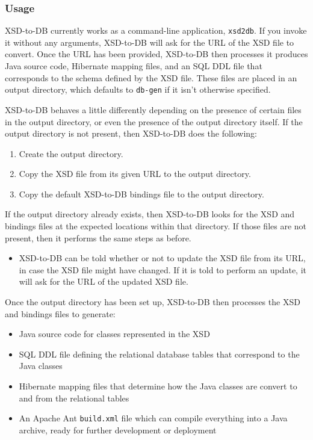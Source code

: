 \documentclass[11pt]{article}
\begin{document}
\subsubsection{Usage}

XSD-to-DB currently works as a command-line application, \texttt{xsd2db}.  If you invoke it without any arguments, XSD-to-DB will ask for the URL of the XSD file to convert.  Once the URL has been provided, XSD-to-DB then processes it produces Java source code, Hibernate mapping files, and an SQL DDL file that corresponds to the schema defined by the XSD file.  These files are placed in an output directory, which defaults to \texttt{db-gen} if it isn't otherwise specified.

XSD-to-DB behaves a little differently depending on the presence of certain files in the output directory, or even the presence of the output directory itself.  If the output directory is not present, then XSD-to-DB does the following:
\begin{enumerate}
\item Create the output directory.
\item Copy the XSD file from its given URL to the output directory.
\item Copy the default XSD-to-DB bindings file to the output directory.
\end{enumerate}
If the output directory already exists, then XSD-to-DB looks for the XSD and bindings files at the expected locations within that directory.  If those files are not present, then it performs the same steps as before.
\begin{itemize}
\item XSD-to-DB can be told whether or not to update the XSD file from its URL, in case the XSD file might have changed.  If it is told to perform an update, it will ask for the URL of the updated XSD file.
\end{itemize}
Once the output directory has been set up, XSD-to-DB then processes the XSD and bindings files to generate:
\begin{itemize}
\item Java source code for classes represented in the XSD
\item SQL DDL file defining the relational database tables that correspond to the Java classes
\item Hibernate mapping files that determine how the Java classes are convert to and from the relational tables
\item An Apache Ant \texttt{build.xml} file which can compile everything into a Java archive, ready for further development or deployment
\end{itemize}
\end{document}
